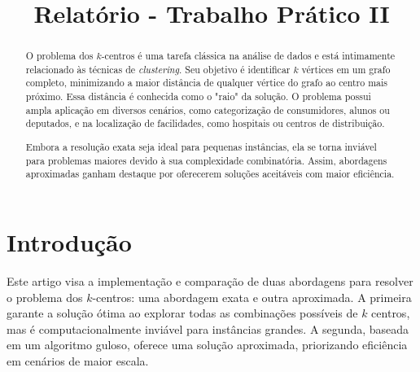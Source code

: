 \documentclass[10pt,conference]{IEEEtran}
\begin{document}
\title{Relatório - Trabalho Prático II}

\newif\iffinal
\finalfalse
\finaltrue
\newcommand{\jemsid}{99999}

\iffinal
\author{
\and
{}
}


\else
  \author{Sibgrapi paper ID: \jemsid \\ }
\fi


\maketitle

\begin{abstract}
O problema dos \(k\)-centros é uma tarefa clássica na análise de dados e está intimamente relacionado às técnicas de \textit{clustering}. Seu objetivo é identificar \(k\) vértices em um grafo completo, minimizando a maior distância de qualquer vértice do grafo ao centro mais próximo. Essa distância é conhecida como o "raio" da solução. O problema possui ampla aplicação em diversos cenários, como categorização de consumidores, alunos ou deputados, e na localização de facilidades, como hospitais ou centros de distribuição. 

Embora a resolução exata seja ideal para pequenas instâncias, ela se torna inviável para problemas maiores devido à sua complexidade combinatória. Assim, abordagens aproximadas ganham destaque por oferecerem soluções aceitáveis com maior eficiência.

\end{abstract}
\IEEEpeerreviewmaketitle

\section{Introdução}

Este artigo visa a implementação e comparação de duas abordagens para resolver o problema dos \(k\)-centros: uma abordagem exata e outra aproximada. A primeira garante a solução ótima ao explorar todas as combinações possíveis de \(k\) centros, mas é computacionalmente inviável para instâncias grandes. A segunda, baseada em um algoritmo guloso, oferece uma solução aproximada, priorizando eficiência em cenários de maior escala.
\end{document}
